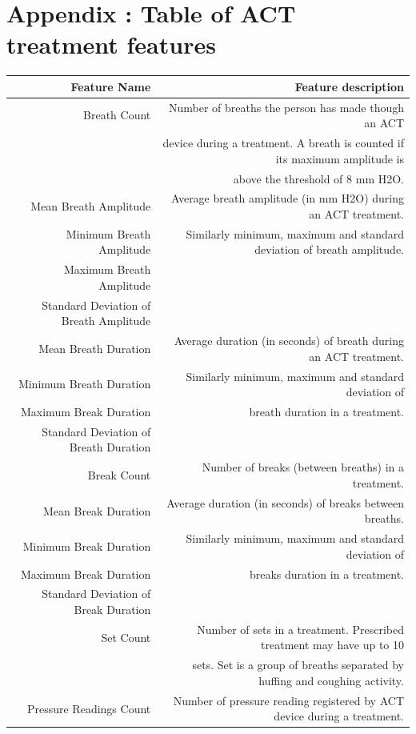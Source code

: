 \documentclass{article}
\begin{document}
\section{Appendix : Table of ACT treatment features}

\begin{longtable}{ n|d}
\toprule
\cmidrule(r){1-2}
\textbf{Feature Name} & \textbf{Feature description} \\
\hline
Breath Count & Number of breaths the person has made though an ACT  \\ 
 ~ & device during a treatment. A breath is counted if its maximum amplitude is \\ ~ & above the threshold of 8 mm H2O.\\
 \hline
 Mean Breath Amplitude & Average breath amplitude (in mm H2O) during an ACT treatment. \\
 Minimum Breath Amplitude & Similarly minimum, maximum and standard deviation of breath amplitude. \\
 Maximum Breath Amplitude & ~ \\
 Standard Deviation of Breath Amplitude & ~ \\
 \hline
 Mean Breath Duration & Average duration (in seconds) of breath during an ACT treatment. \\ 
 Minimum Breath Duration &  Similarly minimum, maximum and standard deviation of \\ 
 Maximum Break Duration & breath duration in a treatment. \\
 Standard Deviation of Breath Duration & ~ \\
 \hline
 Break Count & Number of breaks (between breaths) in a treatment. \\
 \hline
 Mean Break Duration & Average duration (in seconds) of breaks between breaths. \\ 
 Minimum Break Duration & Similarly minimum, maximum and standard deviation of \\ 
 Maximum Break Duration & breaks duration in a treatment. \\
 Standard Deviation of Break Duration & ~ \\
 \hline
 Set Count & Number of sets in a treatment. Prescribed treatment may have up to 10 \\
 ~ & sets. Set is a group of breaths separated by huffing and coughing activity. \\
 \hline
 Pressure Readings Count & Number of pressure reading registered by ACT device during a treatment. \\

\end{longtable}
\end{document}
